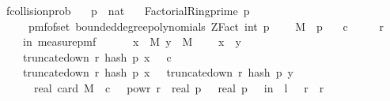 \begin{isabellebody}
\ f{}{\isacharunderscore}{\kern0pt}collision{\isacharunderscore}{\kern0pt}prob{\isacharcolon}{\kern0pt}\isanewline
\ \ \ p\ {\isacharcolon}{\kern0pt}{\isacharcolon}{\kern0pt}\ nat\isanewline
\ \ \ {\isachardoublequoteopen}Factorial{\isacharunderscore}{\kern0pt}Ring{\isachardot}{\kern0pt}prime\ p{\isachardoublequoteclose}\isanewline
\ \ \ {\isachardoublequoteopen}{\isasymOmega}\ {\isasymequiv}\ pmf{\isacharunderscore}{\kern0pt}of{\isacharunderscore}{\kern0pt}set\ {\isacharparenleft}{\kern0pt}bounded{\isacharunderscore}{\kern0pt}degree{\isacharunderscore}{\kern0pt}polynomials\ {\isacharparenleft}{\kern0pt}ZFact\ {\isacharparenleft}{\kern0pt}int\ p{\isacharparenright}{\kern0pt}{\isacharparenright}{\kern0pt}\ {}{\isacharparenright}{\kern0pt}{\isachardoublequoteclose}\isanewline
\ \ \ {\isachardoublequoteopen}M\ {\isasymsubseteq}\ {\isacharbraceleft}{\kern0pt}{}{\isachardot}{\kern0pt}{\isachardot}{\kern0pt}{\isacharless}{\kern0pt}p{\isacharbraceright}{\kern0pt}{\isachardoublequoteclose}\isanewline
\ \ \ {\isachardoublequoteopen}c\ {\isasymge}\ {}{\isachardoublequoteclose}\isanewline
\ \ \ {\isachardoublequoteopen}r\ {\isasymge}\ {}{\isachardoublequoteclose}\isanewline
\ \ \ {\isachardoublequoteopen}{\isasymP}{\isacharparenleft}{\kern0pt}{\isasymomega}\ in\ measure{\isacharunderscore}{\kern0pt}pmf\ {\isasymOmega}{\isachardot}{\kern0pt}\ \isanewline
\ \ \ \ {\isasymexists}x\ {\isasymin}\ M{\isachardot}{\kern0pt}\ {\isasymexists}y\ {\isasymin}\ M{\isachardot}{\kern0pt}\isanewline
\ \ \ \ x\ {\isasymnoteq}\ y\ {\isasymand}\isanewline
\ \ \ \ truncate{\isacharunderscore}{\kern0pt}down\ r\ {\isacharparenleft}{\kern0pt}hash\ p\ x\ {\isasymomega}{\isacharparenright}{\kern0pt}\ {\isasymle}\ c\ {\isasymand}\isanewline
\ \ \ \ truncate{\isacharunderscore}{\kern0pt}down\ r\ {\isacharparenleft}{\kern0pt}hash\ p\ x\ {\isasymomega}{\isacharparenright}{\kern0pt}\ {\isacharequal}{\kern0pt}\ truncate{\isacharunderscore}{\kern0pt}down\ r\ {\isacharparenleft}{\kern0pt}hash\ p\ y\ {\isasymomega}{\isacharparenright}{\kern0pt}{\isacharparenright}{\kern0pt}\ {\isasymle}\ \isanewline
\ \ \ \ {}\ {\isacharasterisk}{\kern0pt}\ {\isacharparenleft}{\kern0pt}real\ {\isacharparenleft}{\kern0pt}card\ M{\isacharparenright}{\kern0pt}{\isacharparenright}{\kern0pt}\ {\isacharasterisk}{\kern0pt}\ c\ {\isacharasterisk}{\kern0pt}\ {}\ powr\ {\isacharminus}{\kern0pt}r\ {\isacharslash}{\kern0pt}\ {\isacharparenleft}{\kern0pt}real\ p{\isacharparenright}{\kern0pt}\ \ {\isacharplus}{\kern0pt}\ {}{\isacharslash}{\kern0pt}real\ p{\isachardoublequoteclose}\ {\isacharparenleft}{\kern0pt}\ {\isachardoublequoteopen}{\isasymP}{\isacharparenleft}{\kern0pt}{\isasymomega}\ in\ {\isacharunderscore}{\kern0pt}{\isachardot}{\kern0pt}\ {\isacharquery}{\kern0pt}l\ {\isasymomega}{\isacharparenright}{\kern0pt}\ {\isasymle}\ {\isacharquery}{\kern0pt}r{}\ {\isacharplus}{\kern0pt}\ {\isacharquery}{\kern0pt}r{}{\isachardoublequoteclose}{\isacharparenright}{\kern0pt}\isanewline

\end{isabellebody}
